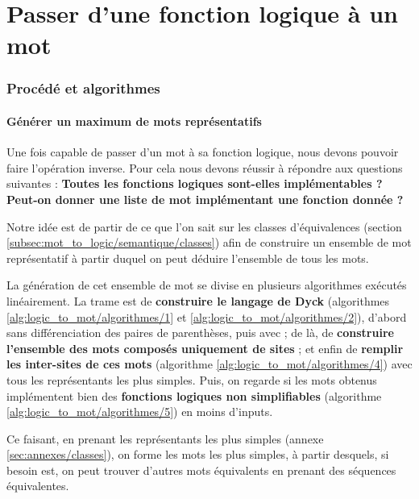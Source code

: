 \part{Passer d'une fonction logique à un mot}
\label{logic_to_mot}

\section{Procédé et algorithmes}
\label{sec:logic_to_mot/procede}

\subsection{Générer un maximum de mots représentatifs}
\label{subsec:logic_to_mot/procede/introduction}
\par
Une fois capable de passer d'un mot à sa fonction logique, nous devons pouvoir faire l'opération inverse. Pour cela nous devons réussir à répondre aux questions suivantes : \textbf{Toutes les fonctions logiques sont-elles implémentables ? Peut-on donner une liste de mot implémentant une fonction donnée ?}
\par
Notre idée est de partir de ce que l'on sait sur les classes d'équivalences (section \ref{subsec:mot_to_logic/semantique/classes}) afin de construire un ensemble de mot représentatif à partir duquel on peut déduire l'ensemble de tous les mots.
\par
La génération de cet ensemble de mot se divise en plusieurs algorithmes exécutés linéairement. La trame est de \textbf{construire le langage de Dyck} (algorithmes \ref{alg:logic_to_mot/algorithmes/1} et \ref{alg:logic_to_mot/algorithmes/2}), d'abord sans différenciation des paires de parenthèses, puis avec ; de là, de \textbf{construire l'ensemble des mots composés uniquement de sites} ; et enfin de \textbf{remplir les inter-sites de ces mots} (algorithme \ref{alg:logic_to_mot/algorithmes/4}) avec tous les représentants les plus simples. Puis, on regarde si les mots obtenus implémentent bien des \textbf{fonctions logiques non simplifiables} (algorithme \ref{alg:logic_to_mot/algorithmes/5}) en moins d'inputs.
\par
Ce faisant, en prenant les représentants les plus simples (annexe \ref{sec:annexes/classes}), on forme les mots les plus simples, à partir desquels, si besoin est, on peut trouver d'autres mots équivalents en prenant des séquences équivalentes.

